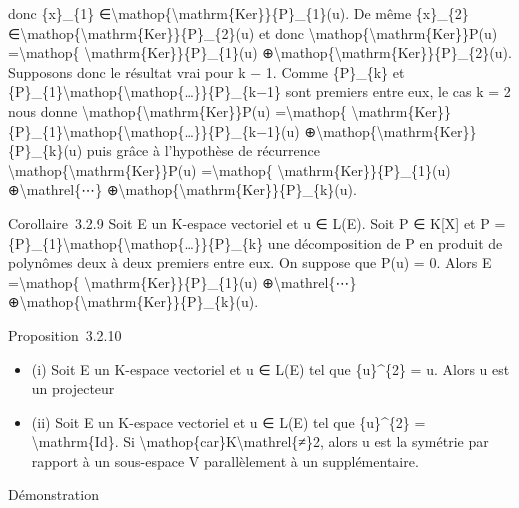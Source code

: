 \documentclass[]{article}
\begin{document}
donc \{x\}\_\{1\}
∈\textbackslash{}mathop\{\textbackslash{}mathrm\{Ker\}\}\{P\}\_\{1\}(u).
De même \{x\}\_\{2\}
∈\textbackslash{}mathop\{\textbackslash{}mathrm\{Ker\}\}\{P\}\_\{2\}(u)
et donc \textbackslash{}mathop\{\textbackslash{}mathrm\{Ker\}\}P(u)
=\textbackslash{}mathop\{ \textbackslash{}mathrm\{Ker\}\}\{P\}\_\{1\}(u)
⊕\textbackslash{}mathop\{\textbackslash{}mathrm\{Ker\}\}\{P\}\_\{2\}(u).
Supposons donc le résultat vrai pour k − 1. Comme \{P\}\_\{k\} et
\{P\}\_\{1\}\textbackslash{}mathop\{\textbackslash{}mathop\{\ldots{}\}\}\{P\}\_\{k−1\}
sont premiers entre eux, le cas k = 2 nous donne
\textbackslash{}mathop\{\textbackslash{}mathrm\{Ker\}\}P(u)
=\textbackslash{}mathop\{
\textbackslash{}mathrm\{Ker\}\}\{P\}\_\{1\}\textbackslash{}mathop\{\textbackslash{}mathop\{\ldots{}\}\}\{P\}\_\{k−1\}(u)
⊕\textbackslash{}mathop\{\textbackslash{}mathrm\{Ker\}\}\{P\}\_\{k\}(u)
puis grâce à l'hypothèse de récurrence
\textbackslash{}mathop\{\textbackslash{}mathrm\{Ker\}\}P(u)
=\textbackslash{}mathop\{ \textbackslash{}mathrm\{Ker\}\}\{P\}\_\{1\}(u)
⊕\textbackslash{}mathrel\{⋯\}
⊕\textbackslash{}mathop\{\textbackslash{}mathrm\{Ker\}\}\{P\}\_\{k\}(u).

Corollaire~3.2.9 Soit E un K-espace vectoriel et u ∈ L(E). Soit P ∈
K{[}X{]} et P =
\{P\}\_\{1\}\textbackslash{}mathop\{\textbackslash{}mathop\{\ldots{}\}\}\{P\}\_\{k\}
une décomposition de P en produit de polynômes deux à deux premiers
entre eux. On suppose que P(u) = 0. Alors E =\textbackslash{}mathop\{
\textbackslash{}mathrm\{Ker\}\}\{P\}\_\{1\}(u)
⊕\textbackslash{}mathrel\{⋯\}
⊕\textbackslash{}mathop\{\textbackslash{}mathrm\{Ker\}\}\{P\}\_\{k\}(u).

Proposition~3.2.10

\begin{itemize}
\itemsep1pt\parskip0pt
\item
  (i) Soit E un K-espace vectoriel et u ∈ L(E) tel que \{u\}\^{}\{2\} =
  u. Alors u est un projecteur
\item
  (ii) Soit E un K-espace vectoriel et u ∈ L(E) tel que \{u\}\^{}\{2\} =
  \textbackslash{}mathrm\{Id\}. Si
  \textbackslash{}mathop\{car\}K\textbackslash{}mathrel\{≠\}2, alors u
  est la symétrie par rapport à un sous-espace V parallèlement à un
  supplémentaire.
\end{itemize}

Démonstration
\end{document}
